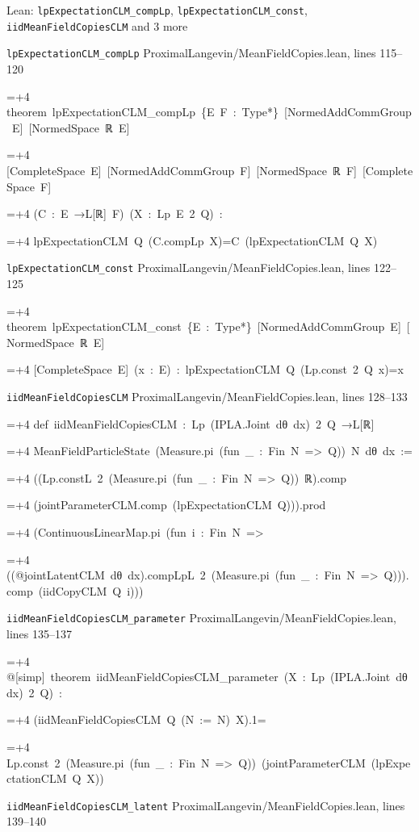 \documentclass[11pt,a4paper]{report}
\newlength{\leancharwidth}
\newenvironment{leancode}{\par\smallskip\begingroup\ttfamily\footnotesize\raggedright
  \settowidth{\leancharwidth}{M}\setlength{\parskip}{0pt}\setlength{\parindent}{0pt}
  \frenchspacing}{\par\endgroup\smallskip}
\newcommand{\leanline}[2]{\hangindent=\dimexpr#1\leancharwidth+4\leancharwidth\relax
  \hangafter=1\noindent\hspace*{#1\leancharwidth}#2\par}
\newcommand{\leansource}[1]{\par{\footnotesize\color{leanmuted}#1}\par}
\begin{document}
\begin{leanbox}{Lean: \texttt{lpExpectationCLM\_\allowbreak{}compLp}, \texttt{lpExpectationCLM\_\allowbreak{}const}, \texttt{iidMeanFieldCopiesCLM} and 3 more}
\leansource{\texttt{lpExpectationCLM\_\allowbreak{}compLp} \quad ProximalLangevin/\allowbreak{}MeanFieldCopies.lean, lines 115–120}
\begin{leancode}
\leanline{0}{theorem\ lpExpectationCLM\_compLp\ \{E\ F\ :\ Type*\}\ [NormedAddCommGroup\ E]\ [NormedSpace\ ℝ\ E]}
\leanline{4}{[CompleteSpace\ E]\ [NormedAddCommGroup\ F]\ [NormedSpace\ ℝ\ F]\ [CompleteSpace\ F]}
\leanline{4}{(C\ :\ E\ →L[ℝ]\ F)\ (X\ :\ Lp\ E\ 2\ Q)\ :}
\leanline{4}{lpExpectationCLM\ Q\ (C.compLp\ X)=C\ (lpExpectationCLM\ Q\ X)}
\end{leancode}
\leansource{\texttt{lpExpectationCLM\_\allowbreak{}const} \quad ProximalLangevin/\allowbreak{}MeanFieldCopies.lean, lines 122–125}
\begin{leancode}
\leanline{0}{theorem\ lpExpectationCLM\_const\ \{E\ :\ Type*\}\ [NormedAddCommGroup\ E]\ [NormedSpace\ ℝ\ E]}
\leanline{4}{[CompleteSpace\ E]\ (x\ :\ E)\ :\ lpExpectationCLM\ Q\ (Lp.const\ 2\ Q\ x)=x}
\end{leancode}
\leansource{\texttt{iidMeanFieldCopiesCLM} \quad ProximalLangevin/\allowbreak{}MeanFieldCopies.lean, lines 128–133}
\begin{leancode}
\leanline{0}{def\ iidMeanFieldCopiesCLM\ :\ Lp\ (IPLA.Joint\ dθ\ dx)\ 2\ Q\ →L[ℝ]}
\leanline{4}{MeanFieldParticleState\ (Measure.pi\ (fun\ \_\ :\ Fin\ N\ =>\ Q))\ N\ dθ\ dx\ :=}
\leanline{2}{((Lp.constL\ 2\ (Measure.pi\ (fun\ \_\ :\ Fin\ N\ =>\ Q))\ ℝ).comp}
\leanline{4}{(jointParameterCLM.comp\ (lpExpectationCLM\ Q))).prod}
\leanline{4}{(ContinuousLinearMap.pi\ (fun\ i\ :\ Fin\ N\ =>}
\leanline{6}{((@jointLatentCLM\ dθ\ dx).compLpL\ 2\ (Measure.pi\ (fun\ \_\ :\ Fin\ N\ =>\ Q))).comp\ (iidCopyCLM\ Q\ i)))}
\end{leancode}
\leansource{\texttt{iidMeanFieldCopiesCLM\_\allowbreak{}parameter} \quad ProximalLangevin/\allowbreak{}MeanFieldCopies.lean, lines 135–137}
\begin{leancode}
\leanline{0}{@[simp]\ theorem\ iidMeanFieldCopiesCLM\_parameter\ (X\ :\ Lp\ (IPLA.Joint\ dθ\ dx)\ 2\ Q)\ :}
\leanline{4}{(iidMeanFieldCopiesCLM\ Q\ (N\ :=\ N)\ X).1=}
\leanline{6}{Lp.const\ 2\ (Measure.pi\ (fun\ \_\ :\ Fin\ N\ =>\ Q))\ (jointParameterCLM\ (lpExpectationCLM\ Q\ X))}
\end{leancode}
\leansource{\texttt{iidMeanFieldCopiesCLM\_\allowbreak{}latent} \quad ProximalLangevin/\allowbreak{}MeanFieldCopies.lean, lines 139–140}

\end{leanbox}
\end{document}

